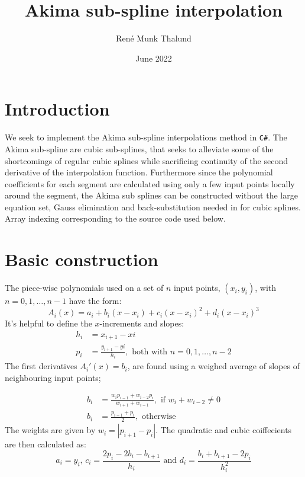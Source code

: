 \documentclass[a4paper]{article}
\title{Akima sub-spline interpolation}
\author{René Munk Thalund}
\date{June 2022}
\begin{document}
\maketitle

\section{Introduction}

We seek to implement the Akima sub-spline interpolations method in \texttt{C\#}. The Akima sub-spline are cubic sub-splines, that seeks to alleviate some of the shortcomings of regular cubic splines while sacrificing continuity of the second derivative of the interpolation function. Furthermore since the polynomial coefficients for each segment are calculated using only a few input points locally around the segment, the Akima sub splines can be constructed without the large equation set, Gauss elimination and back-substitution needed in for cubic splines. Array indexing corresponding to the source code used below.

\section{Basic construction}
The piece-wise polynomials used on a set of $n$ input points, $(x_i,y_i)$, with $n = 0,1, \ldots,n-1$ have the form:
\begin{equation}
    A_i(x) = a_i + b_i(x-x_i) + c_i(x-x_i)^2 + d_i(x-x_i)^3
\end{equation}
It's helpful to define the $x$-increments and slopes:
\begin{align}
    h_i &= x_{i+1} - x{i} \\
    p_i &= \frac{y_{i+1} - y{i}}{h_i}, \text{ both with } n = 0,1, \ldots,n-2
\end{align}
The first derivatives $A_i'(x) = b_i$, are found using a weighed average of slopes of neighbouring input points;

\begin{align}
    \label{eq:b_formula}
    b_i &= \frac{w_{i}p_{i-1} + w_{i-2}p_{i}}{w_{i+1}+w_{i-1}}, \text{ if } w_{i}+w_{i-2} \neq 0  \nonumber \\
    b_i &= \frac{p_{i-1}+p_i}{2}, \text{ otherwise}
\end{align}
The weights are given by $w_i = |p_{i+1}-p_i|$. The quadratic and cubic coiffecients are then calculated as:
\begin{equation}
    a_i = y_i,\,c_i = \frac{2p_i - 2b_i - b_{i+1}}{h_i} \text{  and  } d_i = \frac{b_i + b_{i+1}-2p_i}{h_i^2}
\end{equation}
\end{document}
